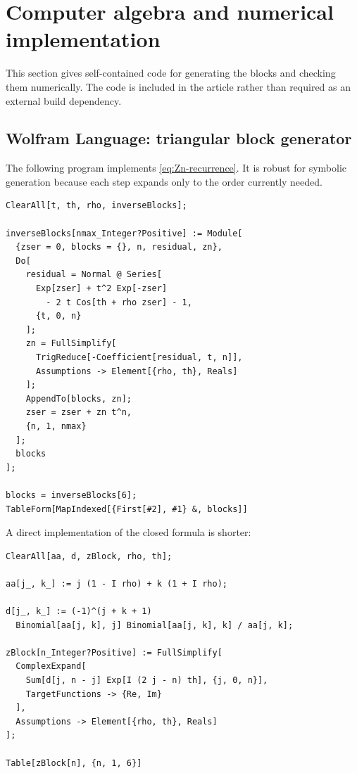 \documentclass[11pt,oneside]{article}
\theoremstyle{plain}
\theoremstyle{definition}
\theoremstyle{remark}
\begin{document}
\section{Computer algebra and numerical implementation}
\label{sec:implementation}

This section gives self-contained code for generating the blocks and checking
them numerically.  The code is included in the article rather than required as
an external build dependency.

\subsection{Wolfram Language: triangular block generator}

The following program implements \eqref{eq:Zn-recurrence}.  It is robust for
symbolic generation because each step expands only to the order currently
needed.

\begin{lstlisting}[style=wolframstyle,caption={Generating the trigonometric blocks \(Z_n\).}]
ClearAll[t, th, rho, inverseBlocks];

inverseBlocks[nmax_Integer?Positive] := Module[
  {zser = 0, blocks = {}, n, residual, zn},
  Do[
    residual = Normal @ Series[
      Exp[zser] + t^2 Exp[-zser]
        - 2 t Cos[th + rho zser] - 1,
      {t, 0, n}
    ];
    zn = FullSimplify[
      TrigReduce[-Coefficient[residual, t, n]],
      Assumptions -> Element[{rho, th}, Reals]
    ];
    AppendTo[blocks, zn];
    zser = zser + zn t^n,
    {n, 1, nmax}
  ];
  blocks
];

blocks = inverseBlocks[6];
TableForm[MapIndexed[{First[#2], #1} &, blocks]]
\end{lstlisting}

A direct implementation of the closed formula is shorter:

\begin{lstlisting}[style=wolframstyle,caption={Closed Lagrange--Good coefficients.}]
ClearAll[aa, d, zBlock, rho, th];

aa[j_, k_] := j (1 - I rho) + k (1 + I rho);

d[j_, k_] := (-1)^(j + k + 1)
  Binomial[aa[j, k], j] Binomial[aa[j, k], k] / aa[j, k];

zBlock[n_Integer?Positive] := FullSimplify[
  ComplexExpand[
    Sum[d[j, n - j] Exp[I (2 j - n) th], {j, 0, n}],
    TargetFunctions -> {Re, Im}
  ],
  Assumptions -> Element[{rho, th}, Reals]
];

Table[zBlock[n], {n, 1, 6}]
\end{lstlisting}
\end{document}

